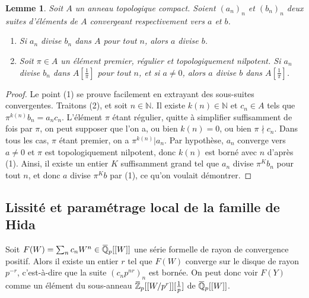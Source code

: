 \documentclass[12pt]{amsart}
\newcommand\bN{\mathbb{N}}
\newcommand\bZ{\mathbb{Z}}
\newcommand\bQ{\mathbb{Q}}
\newcommand{\ob}[1]{\mkern 1.5mu\overline{\mkern-1.5mu#1\mkern-1.5mu}\mkern 1.5mu}
\theoremstyle{defstyle}
\theoremstyle{thmstyle}
\newtheorem{lemme}[subsubsection]{Lemme}
\begin{document}
\begin{lemme}\label{elem}
	Soit $A$ un anneau topologique compact. Soient $(a_n)_n$ et $(b_n)_n$ deux suites d'éléments de $A$ convergeant respectivement vers $a$ et $b$.
	\begin{enumerate}
		
		\item Si $a_n$ divise $b_n$ dans $A$ pour tout $n$, alors $a$ divise $b$.
		\item Soit $\pi \in A$ un élément premier, régulier et topologiquement nilpotent. Si $a_n$ divise $b_n$ dans $A[\tfrac{1}{\pi}]$ pour tout $n$, et si $a \neq 0$, alors $a$ divise $b$ dans $A[\frac{1}{\pi}]$.
	\end{enumerate}
\end{lemme}

\begin{proof}
	Le point (1) se prouve facilement en extrayant des sous-suites convergentes. Traitons (2), et soit $n \in \bN$. Il existe $k(n) \in \bN$ et $c_n\in A$ tels que $\pi^{k(n)}b_n=a_n c_n$. L'élément $\pi$ étant régulier, quitte à simplifier suffisamment de fois par $\pi$, on peut supposer que l'on a, ou bien $k(n)=0$, ou bien $\pi \nmid c_n$. Dans tous les cas, $\pi$ étant premier, on a $\pi^{k(n)}|a_n$. Par hypothèse, $a_n$ converge vers $a\neq 0$ et $\pi$ est topologiquement nilpotent, donc $k(n)$ est borné avec $n$ d'après (1). Ainsi, il existe un entier $K$ suffisamment grand tel que $a_n$ divise $\pi^K b_n$ pour tout $n$, et donc $a$ divise $\pi^K b$ par (1), ce qu'on voulait démontrer. 
\end{proof}



\subsection{Lissité et paramétrage local de la famille de Hida}\label{para_étale}

Soit $F(W)=\sum_n c_n W^n \in \ob{\bQ}_p[[W]]$ une série formelle de rayon de convergence positif. Alors il existe un entier $r$ tel que $F(W)$ converge sur le disque de rayon $p^{-r}$, c'est-à-dire que la suite $(c_n p^{nr})_n$ est bornée. On peut donc voir $F(Y)$ comme un élément du sous-anneau $\ob{\bZ}_p[[W/p^r]][\tfrac{1}{p}]$ de $\ob{\bQ}_p[[W]]$.
\end{document}
